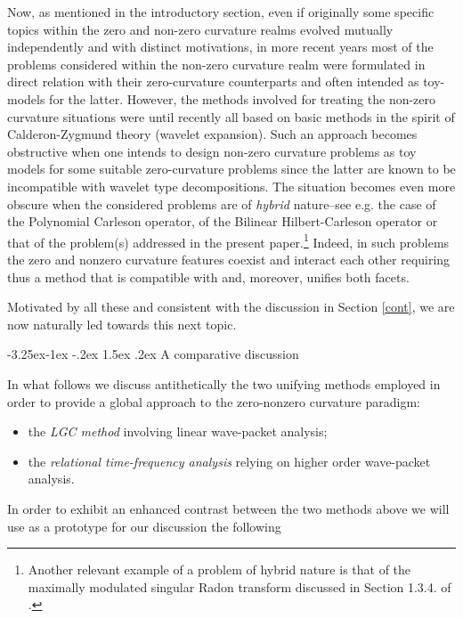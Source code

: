 \documentclass[a4paper,reqno]{amsart}
\makeatletter
\def\subsection{\@startsection{subsection}{2}{\z@}%
	{-3.25ex\@plus -1ex \@minus -.2ex}%
	{1.5ex \@plus .2ex}%
	{\normalfont\bfseries\boldmath}}
\numberwithin{equation}{section}
\theoremstyle{definition}
\makeatother
\begin{document}
Now, as mentioned in the introductory section, even if originally some specific topics within the zero and non-zero curvature realms evolved mutually independently and with distinct motivations, in more recent years most of the problems considered within the non-zero curvature realm were formulated in direct relation with their zero-curvature counterparts and often intended as toy-models for the latter. However, the methods involved for treating the non-zero curvature situations were until recently all based on basic methods in the spirit of Calderon-Zygmund theory (wavelet expansion). Such an approach becomes obstructive when one intends to design non-zero curvature problems as toy models for some suitable zero-curvature problems since the latter are known to be incompatible with wavelet type decompositions. The situation becomes even more obscure when the considered problems are of \emph{hybrid} nature--see e.g. the case of the Polynomial Carleson operator, of the  Bilinear Hilbert-Carleson operator or that of the problem(s) addressed in the present paper.\footnote{Another relevant example of a problem of hybrid nature is that of the maximally modulated singular Radon transform discussed in Section 1.3.4. of \cite{BBLV21}.} Indeed, in such problems the zero and nonzero curvature features coexist and interact each other requiring thus a method that is compatible with and, moreover, unifies both facets.


Motivated by all these and consistent with the discussion in Section \ref{cont}, we are now naturally led towards this next topic.


\subsection{A comparative discussion}\label{compdisc}



In what follows we discuss antithetically the two unifying methods employed in order to provide a global approach to the zero-nonzero curvature paradigm:
\begin{itemize}\label{dichotomy}
	\item the \emph{LGC method} involving linear wave-packet analysis;
	
	\item the \emph{relational time-frequency analysis} relying on higher order wave-packet analysis.
\end{itemize}

In order to exhibit an enhanced contrast between the two methods above we will use as a prototype for our discussion the following
\medskip
\end{document}
